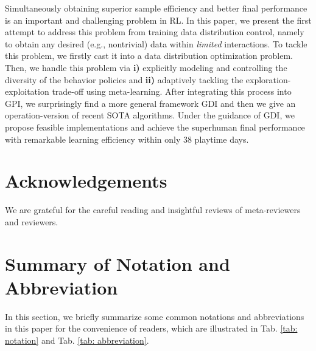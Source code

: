 \documentclass[nohyperref]{article}
\theoremstyle{plain}
\begin{document}
Simultaneously obtaining superior sample efficiency and  better final performance is an important and challenging problem in RL. In this paper, we present the first attempt to address this problem from  training data distribution control, namely to obtain any desired (e.g., nontrivial) data within \emph{limited} interactions. To tackle this problem, we firstly cast it into a data distribution optimization problem. Then, we handle this problem via \textbf{i)} explicitly modeling and controlling the diversity  of the behavior policies and \textbf{ii)} adaptively tackling the  exploration-exploitation trade-off using meta-learning. After integrating this process into GPI, we surprisingly find a more general framework GDI and then we give an operation-version of recent SOTA algorithms. Under the guidance of GDI, we propose feasible implementations and achieve the superhuman final performance with remarkable learning efficiency within only 38 playtime days.



\section*{Acknowledgements}
We are grateful for the careful reading and insightful reviews of meta-reviewers and reviewers.



\nocite{langley00}





\newpage
\appendix
\onecolumn




\iffalse
1. 方法的核心部分其实并没有直观的写出策略多样性的定义
保证讲清楚，讲明了。明确每一个部分的具体内容和实际表现。
\fi




\section{Summary of Notation and Abbreviation}
\label{app: Abbreviation and Notation}
In this section, we briefly summarize some common notations and abbreviations in this paper for the convenience of readers, which are illustrated in Tab. \ref{tab: notation} and Tab. \ref{tab: abbreviation}.
\end{document}
